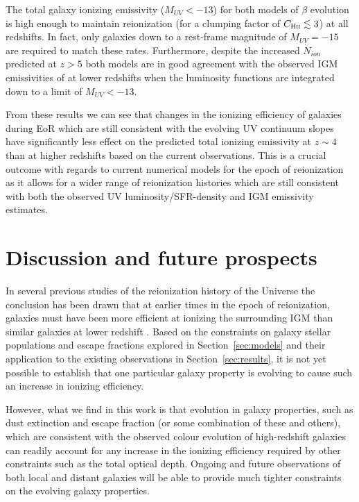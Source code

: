 The total galaxy ionizing emissivity ($M_{UV} < -13$) for both models of $\beta$ evolution is high enough to maintain reionization (for a clumping factor of $C_{\textsc{Hii}} \lesssim 3$) at all redshifts. In fact, only galaxies down to a rest-frame magnitude of $M_{UV} = -15$ are required to match these rates. Furthermore, despite the increased $\dot{N}_{ion}$ predicted at $z > 5$ both models are in good agreement with the observed IGM emissivities of \citet{Becker:2013hc} at lower redshifts when the luminosity functions are integrated down to a limit of $M_{UV} < -13$. 

From these results we can see that changes in the ionizing efficiency of galaxies during EoR which are still consistent with the evolving UV continuum slopes have significantly less effect on the predicted total ionizing emissivity at $z\sim4$ than at higher redshifts based on the current observations. This is a crucial outcome with regards to current numerical models for the epoch of reionization as it allows for a wider range of reionization histories which are still consistent with both the observed UV luminosity/SFR-density and IGM emissivity estimates. 

\section{Discussion and future prospects}\label{sec:discussion}
In several previous studies of the reionization history of the Universe the conclusion has been drawn that at earlier times in the epoch of reionization, galaxies must have been more efficient at ionizing the surrounding IGM than similar galaxies at lower redshift \citep{Becker:2013hc,Kuhlen:2012ka,Robertson:2013ji}. Based on the constraints on galaxy stellar populations and escape fractions explored in Section~\ref{sec:models} and their application to the existing observations in Section~\ref{sec:results}, it is not yet possible to establish that one particular galaxy property is evolving to cause such an increase in ionizing efficiency. 

However, what we find in this work is that evolution in galaxy properties, such as dust extinction and escape fraction (or some combination of these and others), which are consistent with the observed colour evolution of high-redshift galaxies can readily account for any increase in the ionizing efficiency required by other constraints such as the total optical depth. Ongoing and future observations of both local and distant galaxies will be able to provide much tighter constraints on the evolving galaxy properties.

